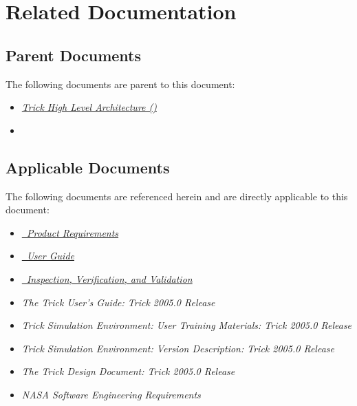 \documentclass[twoside,11pt,titlepage]{report}
\begin{document}
\chapter{Related Documentation}\label{sec:docs}

\section{Parent Documents}
The following documents are parent to this document:

\begin{itemize}
\item{\href{file:\TRICKHLAHOME/docs/TrickHLA.pdf}
           {\em Trick High Level Architecture (\TrickHLA)}}
\cite{trickhlaenv:TrickHLA}

\item{\href{file:MODEL.pdf}
           {\em \MODEL}}
\cite{trickhlaenv:MODEL}
\end{itemize}

\section{Applicable Documents}
The following documents are referenced herein and are directly
applicable to this document:

\begin{itemize}
\item{\href{file:MODELReqt.pdf}
           {\em \MODEL\ Product Requirements}}
\cite{trickhlaenv:MODELReqt}

\item{\href{file:MODELUser.pdf}
           {\em \MODEL\ User Guide}}
\cite{trickhlaenv:MODELUser}

\item{\href{file:MODELIVV.pdf}
           {\em \MODEL\ Inspection, Verification, and Validation}}
\cite{trickhlaenv:MODELIVV}

\item{\em The Trick User's Guide: Trick 2005.0 Release}
\cite{Vetter:TrickUser}

\item{\em Trick Simulation Environment: User Training Materials:
          Trick 2005.0 Release}
\cite{Vetter:TrickUTM}

\item{\em Trick Simulation Environment: Version Description:
          Trick 2005.0 Release}
\cite{Vetter:TrickVD}

\item{\em The Trick Design Document: Trick 2005.0 Release}
\cite{Vetter:TrickDD}

\item{\em NASA Software Engineering Requirements}
\cite{NASA:SWE}
\end{itemize}
\end{document}
